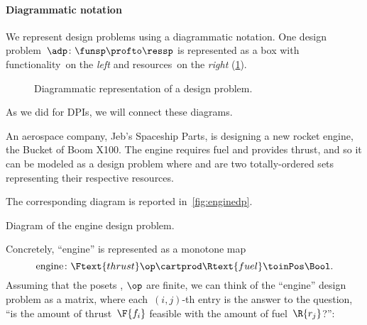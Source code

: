 \paragraph{Diagrammatic notation} We represent design problems using a diagrammatic notation.
One design problem~$\adp \colon \funsp \profto \ressp$ is represented as a box with functionality~\funsp on the \emph{left} and resources~\ressp on the \emph{right} (\cref{fig:diagrammaticdp}).
\begin{figure}[h!]
    \centering
    \caption{Diagrammatic representation of a design problem. }
    \label{fig:diagrammaticdp}
\end{figure}
As we did for DPIs, we will connect these diagrams.
\begin{example}
    An aerospace company, Jeb's Spaceship Parts, is designing a new rocket engine, the Bucket of Boom X100.
    The engine requires fuel and provides thrust, and so it can be modeled as a design problem where  and  are two totally-ordered sets representing their respective resources.
    
    The corresponding diagram is reported in~\cref{fig:enginedp}.
    
    \begin{marginfigure}
        \centering
        \caption{Diagram of the engine design problem.}
        \label{fig:enginedp}
    \end{marginfigure}
    
    Concretely, ``engine'' is represented as a monotone map%
    \begin{equation}
        \text{engine} \colon \Ftext{thrust}\op \cartprod \Rtext{fuel} \toinPos \Bool.
    \end{equation}
    Assuming that the posets , $\op$ are finite, we can think of the ``engine'' design problem as a matrix, where each~$(i,j)$-th entry is the answer to the question, ``is the amount of thrust~$\F{f_i}$ feasible with the amount of fuel~$\R{r_j}$?'':
    

\end{example}

